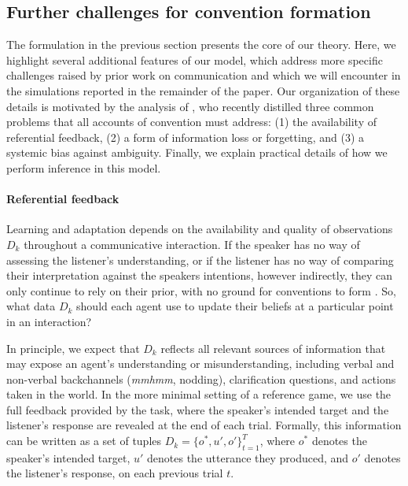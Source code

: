 \subsection{Further challenges for convention formation}

The formulation in the previous section presents the core of our theory.
Here, we highlight several additional features of our model, which address more specific challenges raised by prior work on communication and which we will encounter in the simulations reported in the remainder of the paper. 
Our organization of these details is motivated by the analysis of , who recently distilled three common problems that all accounts of convention must address: (1) the availability of referential feedback, (2) a form of information loss or forgetting, and (3) a systemic bias against ambiguity.
Finally, we explain practical details of how we perform inference in this model. 

\paragraph{Referential feedback}

Learning and adaptation depends on the availability and quality of observations $D_k$ throughout a communicative interaction.
If the speaker has no way of assessing the listener's understanding, or if the listener has no way of comparing their interpretation against the speakers intentions, however indirectly, they can only continue to rely on their prior, with no ground for conventions to form  \cite{KraussWeinheimer66_Tangrams,HupetChantraine92_CollaborationOrRepitition,GarrodFayLeeOberlanderMacLeod07_GraphicalSymbolSystems}.
So, what data $D_k$ should each agent use to update their beliefs at a particular point in an interaction?

In principle, we expect that $D_k$ reflects all relevant sources of information that may expose an agent's understanding or misunderstanding, including verbal and non-verbal backchannels (\emph{mmhmm}, nodding), clarification questions, and actions taken in the world.
In the more minimal setting of a reference game, we use the full feedback provided by the task, where the speaker's intended target and the listener's response are revealed at the end of each trial. 
Formally, this information can be written as a set of tuples $D_k = \{o^*, u', o'\}_{t=1}^T$, where $o^*$ denotes the speaker's intended target, $u'$ denotes the utterance they produced, and $o'$ denotes the listener's response, on each previous trial $t$.

